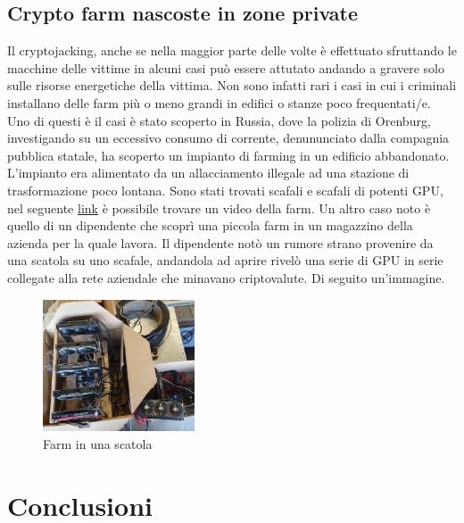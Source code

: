 \documentclass[12pt,a4paper]{article}
\begin{document}
\subsection{Crypto farm nascoste in zone private}
Il cryptojacking, anche se nella maggior parte delle volte è effettuato
sfruttando le macchine delle vittime in alcuni casi può essere attutato andando
a gravere solo sulle risorse energetiche della vittima. Non sono infatti rari i
casi in cui i criminali installano delle farm più o meno grandi in edifici o
stanze poco frequentati/e. Uno di questi è il casi è stato scoperto in Russia,
dove la polizia di Orenburg, investigando su un eccessivo consumo di corrente,
denununciato dalla compagnia pubblica statale, ha scoperto un impianto di
farming in un edificio abbandonato. L'impianto era alimentato da un
allacciamento illegale ad una stazione di trasformazione poco lontana. Sono
stati trovati scafali e scafali di potenti GPU, nel seguente
\href{https://youtu.be/aLTTRZJIvY4}{link} è possibile trovare un video della
farm. Un altro caso noto è quello di un dipendente che scoprì una piccola farm
in un magazzino della azienda per la quale lavora. Il dipendente notò un rumore
strano provenire da una scatola su uno scafale, andandola ad aprire rivelò una
serie di GPU in serie collegate alla rete aziendale che minavano criptovalute.
Di seguito un'immagine.

\begin{figure}[h]
    \centering
    \includegraphics[width=0.40\textwidth]{./images/mini_farm.png}
    \caption{Farm in una scatola}
    \label{fig:mkini_farm}
\end{figure}


\newpage

\section{Conclusioni}

\newpage
\end{document}
